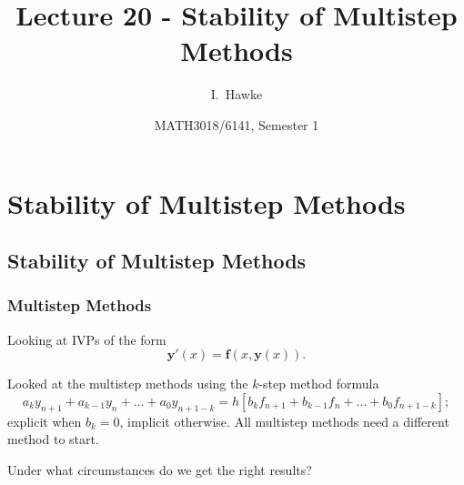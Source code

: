 \documentclass{beamer}
\title[Lecture 20] %
{Lecture 20 - Stability of Multistep Methods}
\author[I. Hawke] %
{I.~Hawke}
\institute[University of Southampton] %
{
  School of Mathematics, \\
  University of Southampton, UK
}
\date[Semester 1] %
{MATH3018/6141, Semester 1}
\newcommand{\by}{{\boldsymbol{y}}}
\newcommand{\bfm}[1]{{\boldsymbol{#1}}}
\begin{document}
\begin{frame}
  \titlepage
\end{frame}

\section{Stability of Multistep Methods}

\subsection{Stability of Multistep Methods}

\begin{frame}
  \frametitle{Multistep Methods}

  Looking at IVPs of the form
  \begin{equation*}
    \by'(x) = \bfm{f}(x, \by(x)).
  \end{equation*} \pause

  Looked at the multistep methods using the $k$-step method formula
  \begin{equation*}
    a_k y_{n+1} + a_{k-1} y_n + \dots + a_0 y_{n+1-k} = h \left[ b_k
      f_{n+1} + b_{k-1} f_n + \dots + b_0 f_{n+1-k} \right];
  \end{equation*}
  explicit when $b_k = 0$, implicit otherwise. All multistep methods
  need a different method to start. \pause

  \vspace{1ex}

  Under what circumstances do we get the right results?

\end{frame}
\end{document}
